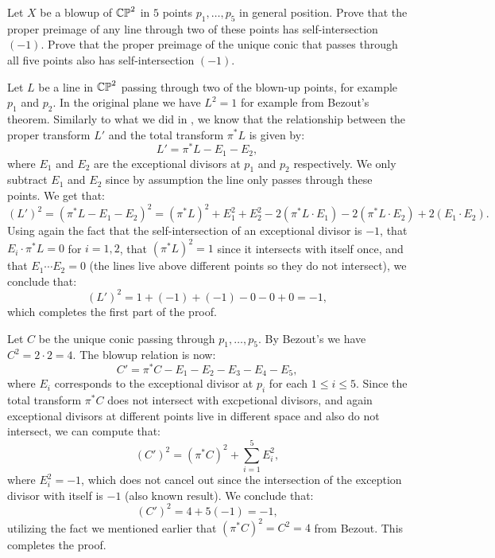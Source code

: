 \documentclass[11pt, a4paper]{article}
\begin{document}
\begin{exercise}
  Let $X$ be a blowup of $\mathbb{CP}^2$ in $5$ points $p_1,\dots,p_5$
  in general position.
  Prove that the proper preimage of any line through two of these points
  has self-intersection $(-1)$.
  Prove that the proper preimage of the unique conic that passes through
  all five points also has self-intersection $(-1)$.
\end{exercise}
\begin{solution}
  Let $L$ be a line in $\mathbb{CP}^2$ passing through two of the blown-up
  points, for example $p_1$ and $p_2$.
  In the original plane we have $L^2 = 1$ for example from Bezout's
  theorem.
  Similarly to what we did in ,
  we know that the relationship between the proper transform $L'$
  and the total transform $\pi^* L$ is given by:
  \[
    L' = \pi^* L - E_1 - E_2,
  \]
  where $E_1$ and $E_2$ are the exceptional divisors at $p_1$
  and $p_2$ respectively.
  We only subtract $E_1$ and $E_2$ since by assumption the line
  only passes through these points.
  We get that:
  \[
    (L')^2 =
    (\pi^* L - E_1 - E_2)^2 =
    (\pi^* L)^2 + E_1^2 + E_2^2 - 2(\pi^* L \cdot E_1) -2(\pi^* L \cdot E_2)
    + 2(E_1 \cdot E_2).
  \]
  Using again the fact that the self-intersection of an exceptional
  divisor is $-1$, that $E_i \cdot \pi^*L = 0$ for $i=1,2$,
  that $(\pi^* L)^2 = 1$ since it intersects with itself once,
  and that $E_1 \cdots E_2 = 0$ (the lines live above different points
  so they do not intersect),
  we conclude that:
  \[
    (L')^2 =
    1 + (-1) + (-1) - 0 - 0 + 0 = -1,
  \]
  which completes the first part of the proof.

  Let $C$ be the unique conic passing through $p_1,\dots,p_5$.
  By Bezout's we have $C^2 = 2 \cdot 2 = 4$.
  The blowup relation is now:
  \[
    C' = \pi^* C - E_1 - E_2 - E_3 - E_4 - E_5,
  \]
  where $E_i$ corresponds to the exceptional divisor at $p_i$ for
  each $1 \le i \le 5$.
  Since the total transform $\pi^* C$ does not intersect
  with excpetional divisors, and again exceptional
  divisors at different points live in different space and also
  do not intersect, we can compute that:
  \[
    (C')^2 = (\pi^* C)^2 + \sum_{i=1}^{5} E_i^2,
  \]
  where $E_i^2 = -1$, which does not cancel out since
  the intersection of the exception divisor with itself is $-1$
  (also known result).
  We conclude that:
  \[
    (C')^2 = 4 + 5(-1) = -1,
  \]
  utilizing the fact we mentioned earlier that $(\pi^* C)^2 = C^2 = 4$
  from Bezout.
  This completes the proof.
\end{solution}
\end{document}

